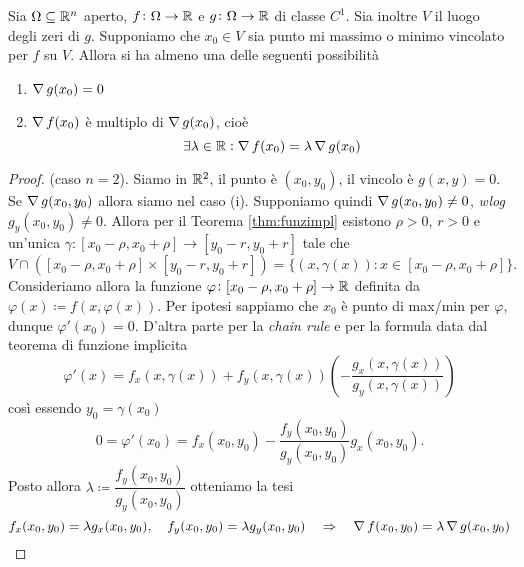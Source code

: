 \begin{thm}
	Sia $ \Omega \subseteq \mathbb{R}^n $ aperto, $ f \colon \Omega \to \mathbb{R} $ e $ g \colon \Omega \to \mathbb{R} $ di classe $ C^1 $. Sia inoltre $ V $ il luogo degli zeri di $ g $. Supponiamo che $ x_0 \in V $ sia punto mi massimo o minimo vincolato per $ f $ su $ V $. Allora si ha almeno una delle seguenti possibilità
	\begin{enumerate}[label = (\roman*)]
		\item $ \operatorname{\nabla}{g}(x_0) = 0 $
		\item $ \operatorname{\nabla}{f}(x_0) $ è multiplo di $ \operatorname{\nabla}{g}(x_0) $, cioè 
		\begin{equation}
			\exists \lambda \in \mathbb{R} : \operatorname{\nabla}{f}(x_0) = \lambda \operatorname{\nabla}{g}(x_0)
		\end{equation}
	\end{enumerate}
\end{thm}
%
\begin{proof}
	(caso $ n = 2 $). Siamo in $ \mathbb{R}^2 $, il punto è $ (x_0, y_0) $, il vincolo è $ g(x, y) = 0 $. Se $ \operatorname{\nabla}{g}(x_0, y_0) $ allora siamo nel caso (i). Supponiamo quindi $ \operatorname{\nabla}{g}(x_0, y_0) \neq 0 $, \emph{wlog} $ g_y(x_0, y_0) \neq 0 $. Allora per il Teorema \ref{thm:funzimpl} esistono $ \rho > 0 $, $ r > 0 $ e un'unica $ \gamma \colon [x_0 - \rho, x_0 + \rho] \to [y_0 - r, y_0 + r] $ tale che 
	\[
		V \cap ([x_0 - \rho, x_0 + \rho] \times [y_0 - r, y_0 + r]) = \{(x, \gamma(x)) : x \in [x_0 - \rho, x_0 + \rho]\}.
	\]
	Consideriamo allora la funzione $ \varphi \colon [x_0 - \rho, x_0 + \rho] \to \mathbb{R} $ definita da $ \varphi(x) \coloneqq f(x, \varphi(x)) $. Per ipotesi sappiamo che $ x_0 $ è punto di max/min per $ \varphi $, dunque $ \varphi'(x_0) = 0 $. D'altra parte per la \emph{chain rule} e per la formula data dal teorema di funzione implicita
	\[
		\varphi'(x) = f_x(x, \gamma(x)) + f_y(x, \gamma(x)) \left(- \frac{g_x(x, \gamma(x))}{g_y(x, \gamma(x))}\right)
	\]
	così essendo $ y_0 = \gamma(x_0) $
	\[
		0 = \varphi'(x_0) = f_x(x_0, y_0) - \frac{f_y(x_0, y_0)}{g_y(x_0, y_0)} g_x(x_0, y_0).
	\]
	Posto allora $ \lambda \coloneqq \dfrac{f_y(x_0, y_0)}{g_y(x_0, y_0)} $ otteniamo la tesi
	\[
		f_x(x_0, y_0) = \lambda g_x(x_0, y_0), \quad f_y(x_0, y_0) = \lambda g_y(x_0, y_0) \quad \Rightarrow \quad \operatorname{\nabla}{f}(x_0, y_0) = \lambda \operatorname{\nabla}{g}(x_0, y_0) \qedhere
	\]
\end{proof}

